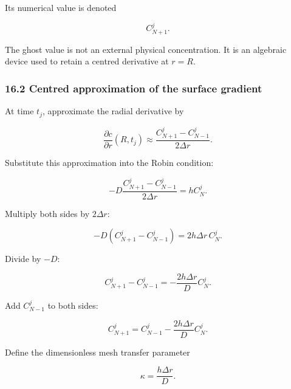 \documentclass[11pt,a4paper]{article}
\begin{document}
Its numerical value is denoted

\begin{equation}
C_{N+1}^j.
\tag{TRISO-DIS-406}
\label{eq:triso-dis-406}
\end{equation}

The ghost value is not an external physical concentration. It is an algebraic device used to retain a centred derivative at $r=R$.

\subsubsection*{16.2 Centred approximation of the surface gradient}

At time $t_j$, approximate the radial derivative by

\begin{equation}
\frac{\partial c}{\partial r}(R,t_j)
\approx
\frac{
C_{N+1}^j-C_{N-1}^j
}{
2\Delta r
}.
\tag{TRISO-DIS-407}
\label{eq:triso-dis-407}
\end{equation}

Substitute this approximation into the Robin condition:

\begin{equation}
-D
\frac{
C_{N+1}^j-C_{N-1}^j
}{
2\Delta r
}
=
hC_N^j.
\tag{TRISO-DIS-408}
\label{eq:triso-dis-408}
\end{equation}

Multiply both sides by $2\Delta r$:

\begin{equation}
-D
\left(
C_{N+1}^j-C_{N-1}^j
\right)
=
2h\Delta r\,C_N^j.
\tag{TRISO-DIS-409}
\label{eq:triso-dis-409}
\end{equation}

Divide by $-D$:

\begin{equation}
C_{N+1}^j-C_{N-1}^j
=
-\frac{2h\Delta r}{D}C_N^j.
\tag{TRISO-DIS-410}
\label{eq:triso-dis-410}
\end{equation}

Add $C_{N-1}^j$ to both sides:

\begin{equation}
C_{N+1}^j
=
C_{N-1}^j
-
\frac{2h\Delta r}{D}C_N^j.
\tag{TRISO-DIS-411}
\label{eq:triso-dis-411}
\end{equation}

Define the dimensionless mesh transfer parameter

\begin{equation}
\boxed{
\kappa
=
\frac{h\Delta r}{D}.
}
\tag{TRISO-DIS-412}
\label{eq:triso-dis-412}
\end{equation}
\end{document}
